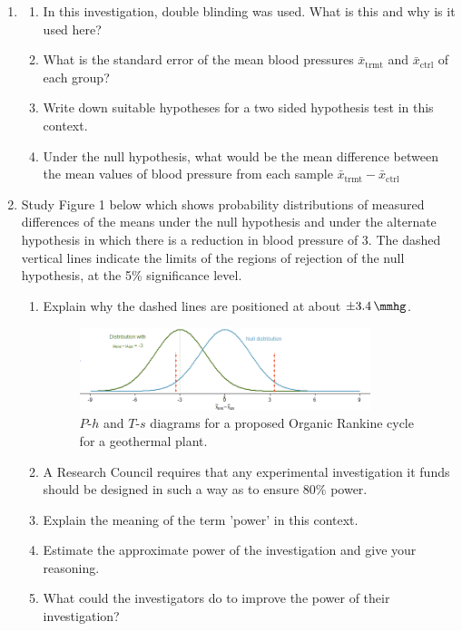\documentclass[a4paper,12pt,fleqn]{article}
\begin{document}
\begin{enumerate}[label=\alph*)]
\item	
	\begin{enumerate}[label=\roman*)]
	\item In this investigation, double blinding was used. What is this and why is it used here?
	\item What is the standard error of the mean blood pressures $\bar{x}_\text{trmt}$ and $\bar{x}_\text{ctrl}$ of each group?
	\item Write down suitable hypotheses for a two sided hypothesis test in this context.
	\item Under the null hypothesis, what would be the mean difference between the mean values of blood pressure from each sample $\bar{x}_\text{trmt}-\bar{x}_\text{ctrl}$
	\end{enumerate}
	
	\item Study Figure 1 below which shows probability distributions of measured differences of the means under the null hypothesis and under the alternate hypothesis in which there is a reduction in blood pressure of \SI{3}{\mmhg}. The dashed vertical lines indicate the limits of the regions of rejection of the null hypothesis, at the 5\% significance level. 
	
	\begin{enumerate}[label=\roman*)]
	\item Explain why the dashed lines are positioned at about $ \pm\SI{3.4}{\mmhg}$.
	
	\begin{figure}[h]
	\centering
	\includegraphics[width=0.85\textwidth]{power_null_C_0_1_7_with_alt_at_3.png}
	\caption{$P$-$h$ and $T$-$s$ diagrams for a proposed Organic Rankine cycle for a geothermal plant.}
	\label{figure:q3b}
	\end{figure}
	
	\item A Research Council requires that any experimental investigation it funds should be designed in such a way as to ensure 80\% power. 
	\item Explain the meaning of the term 'power' in this context.
	\item  Estimate the approximate power of the investigation and give your reasoning.
	\item What could the investigators do to improve the power of their investigation?
	\end{enumerate}
	

\end{enumerate}
\end{document}
